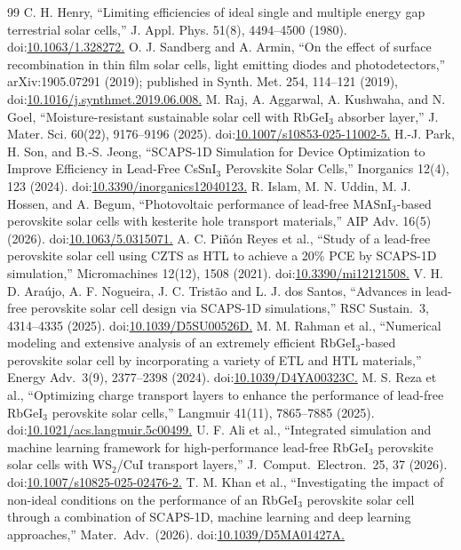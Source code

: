 \documentclass[aip,amsmath,amssymb,preprint]{revtex4-2}
\begin{document}
\begin{thebibliography}{99}
 C. H. Henry, ``Limiting efficiencies of ideal single and multiple energy gap terrestrial solar cells,'' J. Appl. Phys. 51(8), 4494--4500 (1980). doi:\url{10.1063/1.328272.}
 O. J. Sandberg and A. Armin, ``On the effect of surface recombination in thin film solar cells, light emitting diodes and photodetectors,'' arXiv:1905.07291 (2019); published in Synth. Met. 254, 114--121 (2019), doi:\url{10.1016/j.synthmet.2019.06.008.}
 M. Raj, A. Aggarwal, A. Kushwaha, and N. Goel, ``Moisture-resistant sustainable solar cell with RbGeI$_{3}$ absorber layer,'' J. Mater. Sci. 60(22), 9176--9196 (2025). doi:\url{10.1007/s10853-025-11002-5.}
 H.-J. Park, H. Son, and B.-S. Jeong, ``SCAPS-1D Simulation for Device Optimization to Improve Efficiency in Lead-Free CsSnI$_{3}$ Perovskite Solar Cells,'' Inorganics 12(4), 123 (2024). doi:\url{10.3390/inorganics12040123.}
 R. Islam, M. N. Uddin, M. J. Hossen, and A. Begum, ``Photovoltaic performance of lead-free MASnI$_{3}$-based perovskite solar cells with kesterite hole transport materials,'' AIP Adv. 16(5) (2026). doi:\url{10.1063/5.0315071.}
 A. C. Piñón Reyes et al., ``Study of a lead-free perovskite solar cell using CZTS as HTL to achieve a 20\% PCE by SCAPS-1D simulation,'' Micromachines 12(12), 1508 (2021). doi:\url{10.3390/mi12121508.}
 V. H. D. Ara\'ujo, A. F. Nogueira, J. C. Trist\~ao and L. J. dos Santos, ``Advances in lead-free perovskite solar cell design via SCAPS-1D simulations,'' RSC Sustain.\ 3, 4314--4335 (2025). doi:\url{10.1039/D5SU00526D.}
 M. M. Rahman et al., ``Numerical modeling and extensive analysis of an extremely efficient RbGeI$_{3}$-based perovskite solar cell by incorporating a variety of ETL and HTL materials,'' Energy Adv.\ 3(9), 2377--2398 (2024). doi:\url{10.1039/D4YA00323C.}
 M. S. Reza et al., ``Optimizing charge transport layers to enhance the performance of lead-free RbGeI$_{3}$ perovskite solar cells,'' Langmuir 41(11), 7865--7885 (2025). doi:\url{10.1021/acs.langmuir.5c00499.}
 U. F. Ali et al., ``Integrated simulation and machine learning framework for high-performance lead-free RbGeI$_{3}$ perovskite solar cells with WS$_{2}$/CuI transport layers,'' J.\ Comput.\ Electron.\ 25, 37 (2026). doi:\url{10.1007/s10825-025-02476-2.}
 T. M. Khan et al., ``Investigating the impact of non-ideal conditions on the performance of an RbGeI$_{3}$ perovskite solar cell through a combination of SCAPS-1D, machine learning and deep learning approaches,'' Mater.\ Adv.\ (2026). doi:\url{10.1039/D5MA01427A.}

\end{thebibliography}
\end{document}
